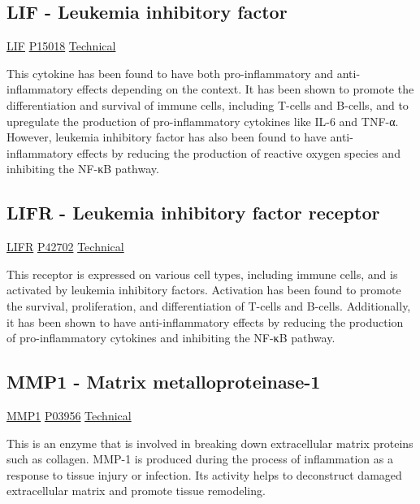 \subsection{LIF - Leukemia inhibitory factor}

\href{https://en.wikipedia.org/wiki/Leukemia\_inhibitory\_factor}{LIF}
\href{http://www.uniprot.org/uniprot/P15018}{P15018}
\href{https://olink.com/products-services/target/protein/?assayID=5125}{Technical}

This cytokine has been found to have both pro-inflammatory and anti-inflammatory effects depending on the context. It has been shown to promote the differentiation and survival of immune cells, including T-cells and B-cells, and to upregulate the production of pro-inflammatory cytokines like IL-6 and TNF-α. However, leukemia inhibitory factor has also been found to have anti-inflammatory effects by reducing the production of reactive oxygen species and inhibiting the NF-κB pathway.

\subsection{LIFR - Leukemia inhibitory factor receptor}

\href{https://en.wikipedia.org/wiki/LIFR}{LIFR}
\href{http://www.uniprot.org/uniprot/P42702}{P42702}
\href{https://olink.com/products-services/target/protein/?assayID=5050}{Technical}

This receptor is expressed on various cell types, including immune cells, and is activated by leukemia inhibitory factors. Activation has been found to promote the survival, proliferation, and differentiation of T-cells and B-cells. Additionally, it has been shown to have anti-inflammatory effects by reducing the production of pro-inflammatory cytokines and inhibiting the NF-κB pathway.


\subsection{MMP1 - Matrix metalloproteinase-1}
\label{in:MMP1}

\href{https://en.wikipedia.org/wiki/Matrix\_metalloproteinase}{MMP1}
\href{http://www.uniprot.org/uniprot/P03956}{P03956}
\href{https://olink.com/products-services/target/protein/?assayID=5060}{Technical}

This is an enzyme that is involved in breaking down extracellular matrix proteins such as collagen. MMP-1 is produced during the process of inflammation as a response to tissue injury or infection. Its activity helps to deconstruct damaged extracellular matrix and promote tissue remodeling.

